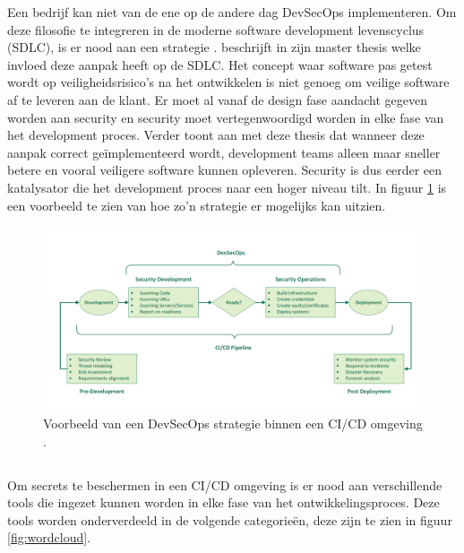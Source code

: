 Een bedrijf kan niet van de ene op de andere dag DevSecOps implementeren. Om deze filosofie te integreren in de moderne software development levenscyclus (SDLC), is er nood aan een strategie \autocite{Jenkins2021}. \textcite{Ahmed2019} beschrijft in zijn master thesis welke invloed deze aanpak heeft op de SDLC. Het concept waar software pas getest wordt op veiligheidsrisico's na het ontwikkelen is niet genoeg om veilige software af te leveren aan de klant. Er moet al vanaf de design fase aandacht gegeven worden aan security en security moet vertegenwoordigd worden in elke fase van het development proces. Verder toont \textcite{Ahmed2019} aan met deze thesis dat wanneer deze aanpak correct geïmplementeerd wordt, development teams alleen maar sneller betere en vooral veiligere software kunnen opleveren. Security is dus eerder een katalysator die het development proces naar een hoger niveau tilt. 
In figuur \ref{fig:schema_DevSecOpsStrategie} is een voorbeeld te zien van hoe zo'n strategie er mogelijks kan uitzien.

\begin{figure}[H]
  \centering
  \includegraphics[scale=0.35]{graphics/schema_DevSecOpsStrategie.png}
  \caption{\label{fig:schema_DevSecOpsStrategie}Voorbeeld van een DevSecOps strategie binnen een CI/CD omgeving \autocite{Jenkins2021}.}
\end{figure}

\subsection{}
\label{sec:Het gebruik van security tools binnen DevSecOps}
Om secrets te beschermen in een CI/CD omgeving is er nood aan verschillende tools die ingezet kunnen worden in elke fase van het ontwikkelingsproces. Deze tools worden onderverdeeld in de volgende categorieën, deze zijn te zien in figuur \ref{fig:wordcloud}.

